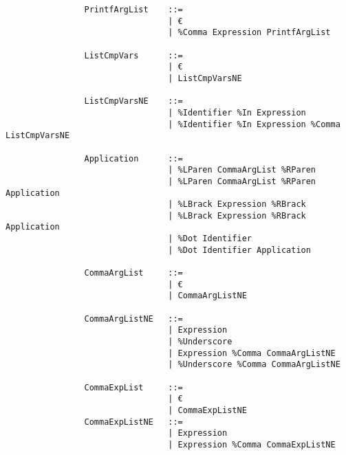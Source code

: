 \documentclass{article}
\begin{document}
\begin{verbatim}
				PrintfArgList    ::=
				                 | €
				                 | %Comma Expression PrintfArgList
				                 
				ListCmpVars      ::=
				                 | €
				                 | ListCmpVarsNE
				                 
				ListCmpVarsNE    ::=
				                 | %Identifier %In Expression
				                 | %Identifier %In Expression %Comma ListCmpVarsNE
				                 
				Application      ::=
				                 | %LParen CommaArgList %RParen
				                 | %LParen CommaArgList %RParen Application
				                 | %LBrack Expression %RBrack
				                 | %LBrack Expression %RBrack Application
				                 | %Dot Identifier
				                 | %Dot Identifier Application
				                
				CommaArgList     ::=
				                 | €
				                 | CommaArgListNE
				                 
				CommaArgListNE   ::=
				                 | Expression
				                 | %Underscore
				                 | Expression %Comma CommaArgListNE
				                 | %Underscore %Comma CommaArgListNE
				
				CommaExpList     ::=
				                 | €
				                 | CommaExpListNE
				CommaExpListNE   ::=
				                 | Expression
				                 | Expression %Comma CommaExpListNE
			\end{verbatim}
	
\end{document}
